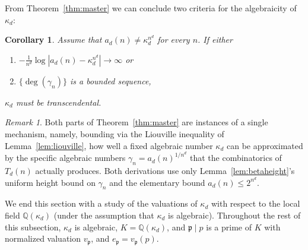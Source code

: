 \documentclass{article}
\theoremstyle{plain}
\newtheorem{corollary}[theorem]{Corollary}
\theoremstyle{definition}
\theoremstyle{remark}
\newtheorem{remark}[theorem]{Remark}
\newcommand{\Q}{\mathbb{Q}}
\begin{document}
From Theorem~\ref{thm:master} we can conclude two criteria for the algebraicity of $\kappa_d$:

\begin{corollary}
Assume that $a_d(n)\ne\kappa_d^{n^d}$ for every $n$. If either
\begin{enumerate}
    \item $-\tfrac1{n^d}\log|a_d(n)-\kappa_d^{n^d}|\to\infty$ or
    \item $\{\deg(\gamma_n)\}$ is a bounded sequence,
\end{enumerate}
$\kappa_d$ must be transcendental. 
\end{corollary}

\begin{remark}
Both parts of Theorem~\ref{thm:master} are instances of a single mechanism, namely, bounding via the Liouville inequality of Lemma~\ref{lem:liouville}, how well a fixed algebraic number $\kappa_d$ can be approximated by the specific algebraic numbers $\gamma_n=a_d(n)^{1/n^d}$ that the combinatorics of $T_d(n)$ actually produces. Both derivations use only Lemma~\ref{lem:betaheight}'s uniform height bound on $\gamma_n$ and the elementary bound $a_d(n)\le2^{n^d}$. 
\end{remark}


We end this section with a study of the valuations of $\kappa_d$ with respect to the local field $\Q(\kappa_d)$ (under the assumption that $\kappa_d$ is algebraic). Throughout the rest of this subsection, $\kappa_d$ is algebraic, $K=\Q(\kappa_d)$, and $\mathfrak p\mid p$ is a prime of $K$ with normalized valuation $v_\mathfrak p$,  and $e_\mathfrak p=v_\mathfrak p(p)$.  %
\end{document}
